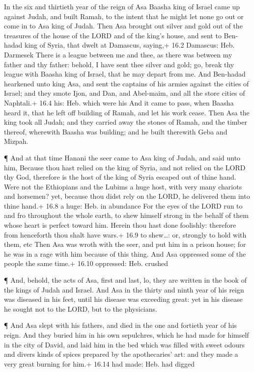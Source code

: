  In the six and thirtieth year of the reign of Asa Baasha
king of Israel came up against Judah, and built Ramah, to the intent
that he might let none go out or come in to Asa king of Judah.
 Then Asa brought out silver and gold out of the treasures
of the house of the LORD and of the king's house, and sent to Ben-hadad
king of Syria, that dwelt at Damascus, saying,+ 16.2 Damascus: Heb.
Darmesek  There is a league between me and thee, as there
was between my father and thy father: behold, I have sent thee silver
and gold; go, break thy league with Baasha king of Israel, that he may
depart from me.  And Ben-hadad hearkened unto king Asa, and
sent the captains of his armies against the cities of Israel; and they
smote Ijon, and Dan, and Abel-maim, and all the store cities of
Naphtali.+ 16.4 his: Heb. which were his  And it came to
pass, when Baasha heard it, that he left off building of Ramah, and let
his work cease.  Then Asa the king took all Judah; and they
carried away the stones of Ramah, and the timber thereof, wherewith
Baasha was building; and he built therewith Geba and Mizpah.

 ¶ And at that time Hanani the seer came to Asa king of
Judah, and said unto him, Because thou hast relied on the king of Syria,
and not relied on the LORD thy God, therefore is the host of the king of
Syria escaped out of thine hand.  Were not the Ethiopians
and the Lubims a huge host, with very many chariots and horsemen? yet,
because thou didst rely on the LORD, he delivered them into thine hand.+
16.8 a huge: Heb. in abundance  For the eyes of the LORD run
to and fro throughout the whole earth, to shew himself strong in the
behalf of them whose heart is perfect toward him. Herein thou hast done
foolishly: therefore from henceforth thou shalt have wars.+ 16.9 to
shew\ldots: or, strongly to hold with them, etc  Then Asa
was wroth with the seer, and put him in a prison house; for he was in a
rage with him because of this thing. And Asa oppressed some of the
people the same time.+ 16.10 oppressed: Heb. crushed

 ¶ And, behold, the acts of Asa, first and last, lo, they
are written in the book of the kings of Judah and Israel. 
And Asa in the thirty and ninth year of his reign was diseased in his
feet, until his disease was exceeding great: yet in his disease he
sought not to the LORD, but to the physicians.

 ¶ And Asa slept with his fathers, and died in the one and
fortieth year of his reign.  And they buried him in his own
sepulchres, which he had made for himself in the city of David, and laid
him in the bed which was filled with sweet odours and divers kinds of
spices prepared by the apothecaries' art: and they made a very great
burning for him.+ 16.14 had made: Heb. had digged

